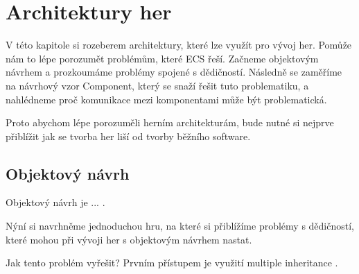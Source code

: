 
\chapter{Architektury her}
V této kapitole si rozeberem architektury, které lze využít pro vývoj her. Pomůže nám to lépe porozumět problémům, které ECS řeší. Začneme objektovým návrhem a prozkoumáme problémy spojené s dědičností. Následně se zaměříme na návrhový vzor Component, který se snaží řešit tuto problematiku, a nahlédneme proč komunikace mezi komponentami může být problematická.

Proto abychom lépe porozuměli herním architekturám, bude nutné si nejprve přiblížit jak se tvorba her liší od tvorby běžního software.


\section{Objektový návrh}
Objektový návrh je ... .

Nýní si navrhněme jednoduchou hru, na které si přiblížíme problémy s dědičností, které mohou při vývoji her s objektovým návrhem nastat.

Jak tento problém vyřešit? Prvním přístupem je využití multiple inheritance .

